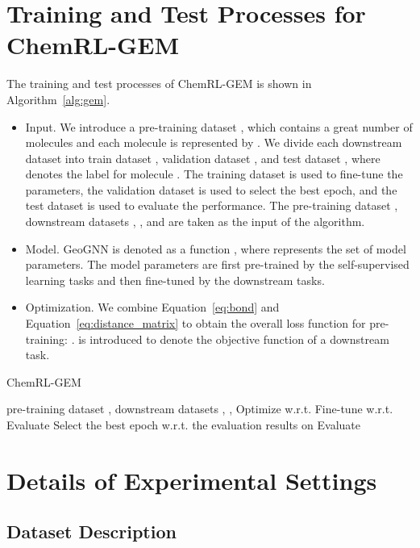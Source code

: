 \documentclass{article}
\begin{document}
\section{Training and Test Processes for ChemRL-GEM}
The training and test processes of ChemRL-GEM is shown in Algorithm~\ref{alg:gem}.
\begin{itemize}
    \item Input. We introduce a pre-training dataset , which contains a great number of molecules and each molecule is represented by . We divide each downstream dataset into train dataset , validation dataset , and test dataset , where  denotes the label for molecule . The training dataset  is used to fine-tune the parameters, the validation dataset  is used to select the best epoch, and the test dataset  is used to evaluate the performance. The pre-training dataset , downstream datasets , , and  are taken as the input of the algorithm.
    \item Model. GeoGNN is denoted as a function , where  represents the set of model parameters. The model parameters are first pre-trained by the self-supervised learning tasks and then fine-tuned by the downstream tasks.
    \item Optimization. We combine Equation~\ref{eq:bond} and Equation~\ref{eq:distance_matrix} to obtain the overall loss function for pre-training: .  is introduced to denote the objective function of a downstream task.
\end{itemize} 

\begin{algorithm}
	\caption{ChemRL-GEM} 
	\begin{algorithmic}[1]
	    \Require pre-training dataset , downstream datasets , , 
		\For {} 
			\For {}
				\State Optimize  w.r.t. 
			\EndFor
		\EndFor
		\For {} 
			\For {}
				\State Fine-tune  w.r.t. 
			\EndFor
			\For {}
			    \State Evaluate 
			\EndFor
		\EndFor
	\State Select the best epoch w.r.t. the evaluation results on 
	\For {} 
		\State Evaluate 
	\EndFor
	\end{algorithmic} 
	\label{alg:gem}
\end{algorithm}

\section{Details of Experimental Settings}\label{appendix:exp}
\subsection{Dataset Description}
\end{document}
